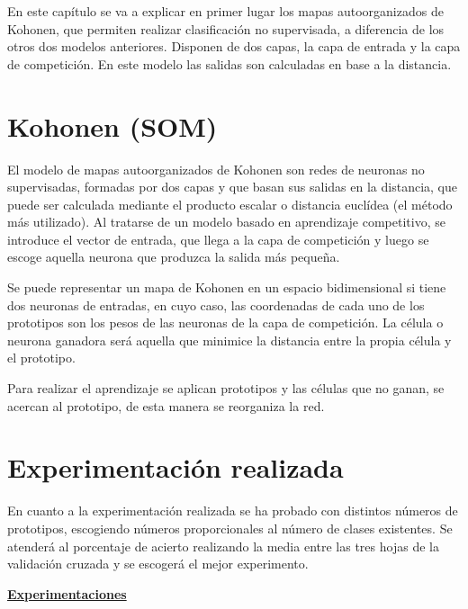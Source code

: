 \documentclass[11pt,spanish,listoffigures,listoftables]{workluis}
\begin{document}
\par En este capítulo se va a explicar en primer lugar los mapas autoorganizados de Kohonen, que permiten realizar clasificación no supervisada, a diferencia de los otros dos modelos anteriores. Disponen de dos capas, la capa de entrada y la capa de competición. En este modelo las salidas son calculadas en base a la distancia.

\section{Kohonen (SOM)}

\par El modelo de mapas autoorganizados de Kohonen son redes de neuronas no supervisadas, formadas por dos capas y que basan sus salidas en la distancia, que puede ser calculada mediante el producto escalar o distancia euclídea (el método más utilizado). Al tratarse de un modelo basado en aprendizaje competitivo, se introduce el vector de entrada, que llega a la capa de competición y luego se escoge aquella neurona que produzca la salida más pequeña.

\par Se puede representar un mapa de Kohonen en un espacio bidimensional si tiene dos neuronas de entradas, en cuyo caso, las coordenadas de cada uno de los prototipos son los pesos de las neuronas de la capa de competición. La célula o neurona ganadora será aquella que minimice la distancia entre la propia célula y el prototipo.

\par Para realizar el aprendizaje se aplican prototipos y las células que no ganan, se acercan al prototipo, de esta manera se reorganiza la red.

\section{Experimentación realizada}

\par En cuanto a la experimentación realizada se ha probado con distintos números de prototipos, escogiendo números proporcionales al número de clases existentes. Se atenderá al porcentaje de acierto realizando la media entre las tres hojas de la validación cruzada y se escogerá el mejor experimento.


\par \underline{\textbf{Experimentaciones}}


\end{document}

